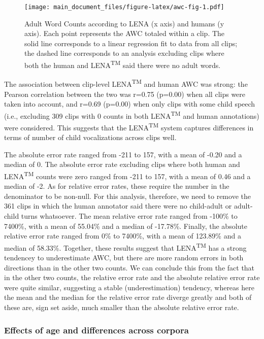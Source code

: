 \documentclass[english,floatsintext,man]{apa6}
\begin{document}
\begin{figure}
\centering
\texttt{[image: main\_document\_files/figure-latex/awc-fig-1.pdf]}
\caption{\label{fig:awc-fig}Adult Word Counts according to LENA (x axis) and
humans (y axis). Each point represents the AWC totaled within a clip.
The solid line corresponds to a linear regression fit to data from all
clips; the dashed line corresponds to an analysis excluding clips where
both the human and LENA\textsuperscript{TM} said there were no adult
words.}
\end{figure}

The association between clip-level LENA\textsuperscript{TM} and human
AWC was strong: the Pearson correlation between the two was r=0.75
(p=0.00) when all clips were taken into account, and r=0.69 (p=0.00)
when only clips with some child speech (i.e., excluding 309 clips with 0
counts in both LENA\textsuperscript{TM} and human annotations) were
considered. This suggests that the LENA\textsuperscript{TM} system
captures differences in terms of number of child vocalizations across
clips well.

The absolute error rate ranged from -211 to 157, with a mean of -0.20
and a median of 0. The absolute error rate excluding clips where both
human and LENA\textsuperscript{TM} counts were zero ranged from -211 to
157, with a mean of 0.46 and a median of -2. As for relative error
rates, these require the number in the denominator to be non-null. For
this analysis, therefore, we need to remove the 361 clips in which the
human annotator said there were no child-adult or adult-child turns
whatsoever. The mean relative error rate ranged from -100\% to 7400\%,
with a mean of 55.04\% and a median of -17.78\%. Finally, the absolute
relative error rate ranged from 0\% to 7400\%, with a mean of 123.89\%
and a median of 58.33\%. Together, these results suggest that
LENA\textsuperscript{TM} has a strong tendencey to underestimate AWC,
but there are more random errors in both directions than in the other
two counts. We can conclude this from the fact that in the other two
counts, the relative error rate and the absolute relative error rate
were quite similar, suggesting a stable (underestimation) tendency,
whereas here the mean and the median for the relative error rate diverge
greatly and both of these are, sign set aside, much smaller than the
absolute relative error rate.

\subsubsection{Effects of age and differences across
corpora}\label{effects-of-age-and-differences-across-corpora}
\end{document}
